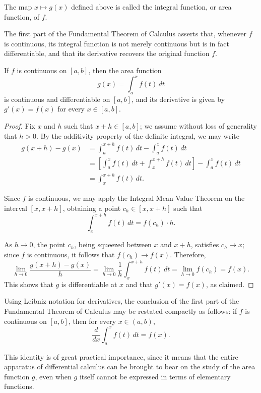 \begin{definition}
The map $x \mapsto g(x)$ defined above is called the integral function, or area function, of $f$.
\end{definition}

The first part of the Fundamental Theorem of Calculus asserts that, whenever $f$ is continuous, its integral function is not merely continuous but is in fact differentiable, and that its derivative recovers the original function $f$.

\begin{theorem}
If $f$ is continuous on $[a,b]$, then the area function \[
g(x) = \int_a^x f(t) \, dt
\] is continuous and differentiable on $[a,b]$, and its derivative is given by $g'(x) = f(x)$ for every $x \in [a,b]$.
\end{theorem}

\begin{proof}
Fix $x$ and $h$ such that $x+h \in [a,b]$; we assume without loss of generality that $h > 0$. By the additivity property of the definite integral, we may write
\[
\begin{aligned}
g(x+h) - g(x)
&= \int_a^{x+h} f(t) \, dt - \int_a^x f(t) \, dt \\
&= \left[ \int_a^x f(t) \, dt + \int_x^{x+h} f(t) \, dt \right]
- \int_a^x f(t) \, dt \\
&= \int_x^{x+h} f(t) \, dt.
\end{aligned}
\]

Since $f$ is continuous, we may apply the Integral Mean Value Theorem on the interval $[x, x+h]$, obtaining a point $c_h \in [x, x+h]$ such that
\[
\int_x^{x+h} f(t) \, dt = f(c_h) \cdot h.
\]

As $h \to 0$, the point $c_h$, being squeezed between $x$ and $x+h$, satisfies $c_h \to x$; since $f$ is continuous, it follows that $f(c_h) \to f(x)$. Therefore,
\[
\lim_{h \to 0} \frac{g(x+h) - g(x)}{h} = \lim_{h \to 0} \frac{1}{h} \int_x^{x+h} f(t) \, dt = \lim_{h \to 0} f(c_h) = f(x).
\]
This shows that $g$ is differentiable at $x$ and that $g'(x) = f(x)$, as claimed.
\end{proof}

Using Leibniz notation for derivatives, the conclusion of the first part of the Fundamental Theorem of Calculus may be restated compactly as follows: if $f$ is continuous on $[a,b]$, then for every $x \in (a,b)$,
\[
\frac{d}{dx} \int_a^x f(t) \, dt = f(x).
\]

This identity is of great practical importance, since it means that the entire apparatus of differential calculus can be brought to bear on the study of the area function $g$, even when $g$ itself cannot be expressed in terms of elementary functions.

